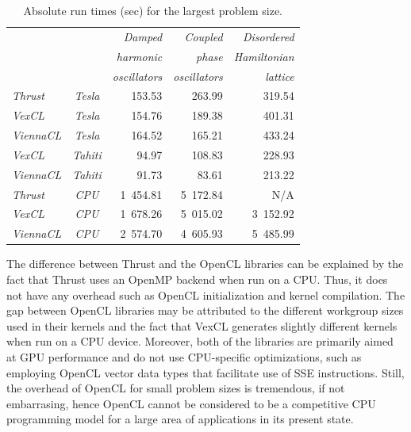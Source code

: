 \documentclass[final]{siamltex}
\begin{document}
\begin{table}
 \centering
    \caption{Absolute run times (sec) for the largest problem size.}
    \label{tab:abstimes}
    \begin{tabular}{|lc|rrr|}
	\hline
	& & \em Damped	    & \em Coupled	& \em Disordered  \\ %
	& & \em harmonic    & \em phase		& \em Hamiltonian \\ %
	& & \em oscillators & \em oscillators	& \em lattice	  \\ %
	\hline
	\em Thrust   &\em Tesla & 153.53 & 263.99 & 319.54 \\ %
	\em VexCL    &\em Tesla & 154.76 & 189.38 & 401.31 \\ %
	\em ViennaCL &\em Tesla & 164.52 & 165.21 & 433.24 \\ %
	\hline
	\em VexCL    &\em Tahiti &  94.97 & 108.83 & 228.93 \\ %
	\em ViennaCL &\em Tahiti &  91.73 &  83.61 & 213.22 \\ %
	\hline
	\em Thrust   &\em CPU	& 1~454.81 & 5~172.84 &      N/A \\ %
	\em VexCL    &\em CPU	& 1~678.26 & 5~015.02 & 3~152.92 \\ %
	\em ViennaCL &\em CPU	& 2~574.70 & 4~605.93 & 5~485.99 \\ %
	\hline
    \end{tabular}
\end{table}


The difference between Thrust and the OpenCL libraries can be explained by the fact
that Thrust uses an OpenMP backend when run on a CPU. Thus, it does not have any
overhead such as OpenCL initialization and kernel compilation.  The gap
between OpenCL libraries may be attributed to the different workgroup sizes
used in their kernels and the fact that VexCL generates slightly different
kernels when run on a CPU device. Moreover, both of the libraries are primarily
aimed at GPU performance and do not use CPU-specific optimizations, such as
employing OpenCL vector data types that facilitate use of SSE instructions.
Still, the overhead of OpenCL for small problem sizes is tremendous, if not embarrasing,
hence OpenCL cannot be considered to be a competitive CPU programming model for a large area of applications in its present state. %
\end{document}
